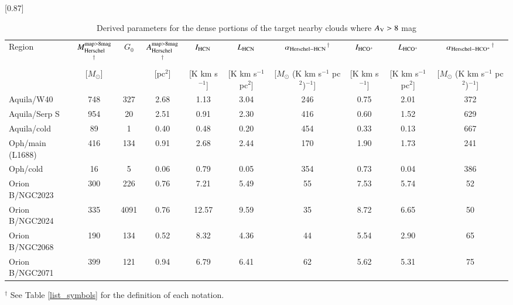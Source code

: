 \begin{table*}
\centering
\scalebox{0.87}[0.87]{
\tiny
\begin{threeparttable}
\caption{Derived parameters for the dense portions of the target nearby clouds where $A_{\rm V} > 8$ mag   \label{table:table_8mag}}
\begin{tabular}{lccccccccc}
\hline
Region & $M_{\rm Herschel}^{\rm map>8mag}$$^\dag$ & $G_0$  &  $A_{\rm Herschel}^{\rm map>8mag}$$^\dag$ & $I_{\rm HCN}$ & $L_{\rm HCN}$ & $\alpha_{\rm Herschel-HCN}$$^\dag$ & $I_{\rm HCO^+}$ & $L_{\rm HCO^+}$ & $\alpha_{\rm Herschel-HCO^+}$$^\dag$\\
 & [$M_{\odot}$] & & [pc$^2$] & [K km s$^{-1}$] & [K km s$^{-1}$ pc$^2$]& [$M_{\odot}$ (K km s$^{-1}$ pc$^2$)$^{-1}$] & [K km s$^{-1}$] & [K km s$^{-1}$ pc$^2$]& [$M_{\odot}$ (K km s$^{-1}$ pc$^2$)$^{-1}$] \\
\hline
Aquila/W40&   748 &   327&    2.68&    1.13&    3.04&   246&    0.75&
    2.01&   372\\
Aquila/Serp S&   954&    20&    2.51&    0.91&    2.30&   416&    0.60&
    1.52&   629\\
Aquila/cold&    89&     1&    0.40&    0.48&    0.20&   454&    0.33&
    0.13&   667\\
\hline
Oph/main (L1688)&   416&   134&    0.91&    2.68&    2.44&   170&    1.90&    1.73
&   241\\
Oph/cold&    16&     5&    0.06&    0.79&    0.05&   354&    0.73&    0.04
&   386\\
\hline
Orion B/NGC2023&   300&   226&    0.76&    7.21&    5.49&    55&    7.53&
    5.74&    52\\
Orion B/NGC2024&   335&  4091&    0.76&   12.57&    9.59&    35&    8.72&
    6.65&    50\\
Orion B/NGC2068&   190&   134&    0.52&    8.32&    4.36&    44&    5.54&
    2.90&    65\\
Orion B/NGC2071&   399 &   121 &    0.94&    6.79&    6.41&    62&    5.62&
    5.31&    75\\
\hline
\end{tabular}
\begin{tablenotes}
\item[$^\dag$] {See Table \ref{list_symbols} for the definition of each notation.}
\end{tablenotes}
\end{threeparttable}
}
\end{table*}

